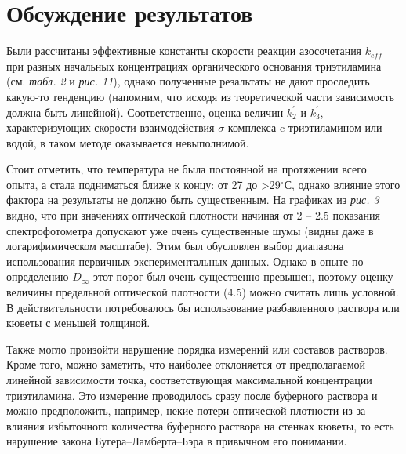 \documentclass[a4paper]{article}
\begin{document}
\section{\LARGE Обсуждение результатов}
\par \hspace{0.4 cm}
Были рассчитаны эффективные константы скорости реакции азосочетания $k_{eff}$ при разных начальных концентрациях органического основания триэтиламина (см. \textit{табл. 2} и \textit{рис. 11}), однако полученные резальтаты не дают проследить какую-то тенденцию (напомним, что исходя из теоретической части зависимость должна быть линейной). Соответственно, оценка величин $k_2^{'}$ и $k_3^{'}$, характеризующих скорости взаимодействия $\sigma$-комплекса c триэтиламином или водой, в таком методе оказывается невыполнимой. \par \vspace{0.2 cm}
Стоит отметить, что температура не была постоянной на протяжении всего опыта, а стала подниматься ближе к концу: от 27 до >29$^{\circ}$С, однако влияние этого фактора на результаты не должно быть существенным. На графиках из \textit{рис. 3} видно, что при значениях оптической плотности начиная от 2 -- 2.5 показания спектрофотометра допускают уже очень существенные шумы (видны даже в логарифимическом масштабе). Этим был обусловлен выбор диапазона использования первичных экспериментальных данных. Однако в опыте по определению $D_{\infty}$ этот порог был очень существенно превышен, поэтому оценку величины предельной оптической плотности (4.5) можно считать лишь условной. В действительности потребовалось бы использование разбавленного раствора или кюветы с меньшей толщиной. \par
Также могло произойти нарушение порядка измерений или составов растворов. Кроме того, можно заметить, что наиболее отклоняется от предполагаемой линейной зависимости точка, соответствующая максимальной концентрации триэтиламина. Это измерение проводилось сразу после буферного раствора и можно предположить, например, некие потери оптической плотности из-за влияния избыточного количества буферного раствора на стенках кюветы, то есть нарушение закона Бугера--Ламберта--Бэра в привычном его понимании.
\end{document}
